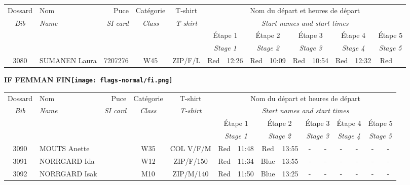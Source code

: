 \documentclass{report}
\begin{document}
  \begin{longtable}{|c|l|r|c|c|*{5}{cc|}}
    Dossard & Nom  & Puce    & Catégorie & T-shirt & \multicolumn{10}{c|}{Nom du départ et heures de départ} \\
    \itshape Bib     & \itshape Name & \itshape SI card & \itshape Class  & \itshape  T-shirt  & \multicolumn{10}{c|}{\itshape Start names and start times} \\
    \hline
    & & & & & \multicolumn{2}{c|}{Étape 1} & \multicolumn{2}{c|}{Étape 2} & \multicolumn{2}{c|}{Étape 3} & \multicolumn{2}{c|}{Étape 4} & \multicolumn{2}{c|}{Étape 5} \\
    & & & & & \multicolumn{2}{c|}{\itshape Stage 1} & \multicolumn{2}{c|}{\itshape Stage 2} & \multicolumn{2}{c|}{\itshape Stage 3} & \multicolumn{2}{c|}{\itshape Stage 4} & \multicolumn{2}{c|}{\itshape Stage 5} \\
    \hline
    3080 & SUMANEN Laura & 7207276 & W45 & ZIP/F/L & Red & 12:26 & Red & 10:09 & Red & 10:54 & Red & 12:32 & Red &  \\
  \end{longtable}
\newpage
  \Huge \centering \bfseries IF FEMMAN  FIN\normalfont \footnotesize \sffamily \hfill \texttt{[image: flags-normal/fi.png]} \newline 
  \begin{longtable}{|c|l|r|c|c|*{5}{cc|}}
    Dossard & Nom  & Puce    & Catégorie & T-shirt & \multicolumn{10}{c|}{Nom du départ et heures de départ} \\
    \itshape Bib     & \itshape Name & \itshape SI card & \itshape Class  & \itshape  T-shirt  & \multicolumn{10}{c|}{\itshape Start names and start times} \\
    \hline
    & & & & & \multicolumn{2}{c|}{Étape 1} & \multicolumn{2}{c|}{Étape 2} & \multicolumn{2}{c|}{Étape 3} & \multicolumn{2}{c|}{Étape 4} & \multicolumn{2}{c|}{Étape 5} \\
    & & & & & \multicolumn{2}{c|}{\itshape Stage 1} & \multicolumn{2}{c|}{\itshape Stage 2} & \multicolumn{2}{c|}{\itshape Stage 3} & \multicolumn{2}{c|}{\itshape Stage 4} & \multicolumn{2}{c|}{\itshape Stage 5} \\
    \hline
    3090 & MOUTS Anette &  & W35 & COL V/F/M & Red & 11:48 & Red & 13:55 & - &  - & - &  - & - &  -\\
    3091 & NORRGARD Ida &  & W12 & ZIP/F/150 & Red & 11:34 & Blue & 13:55 & - &  - & - &  - & - &  -\\
    3092 & NORRGARD Isak &  & M10 & ZIP/M/140 & Red & 11:50 & Blue & 13:25 & - &  - & - &  - & - &  -\\
  \end{longtable}
\end{document}
